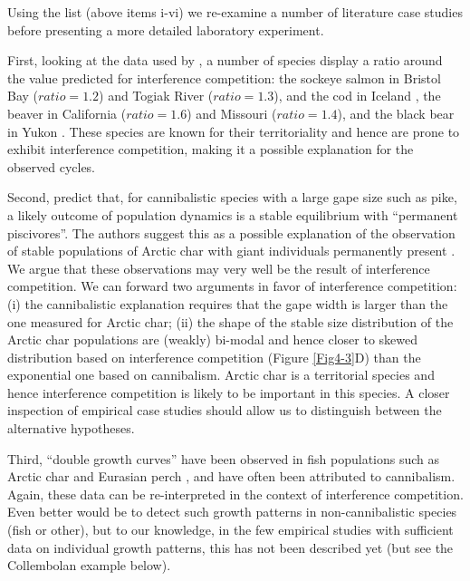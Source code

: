 Using the list (above items i-vi) we re-examine a number of literature case
studies before presenting a more detailed laboratory experiment. 

First, looking at the data used by \textcite{murdoch2002a}, a number of species
display a ratio around the value predicted for interference competition: the
sockeye salmon in Bristol Bay ($ratio=1.2$) and Togiak River ($ratio=1.3$), and
the cod in Iceland \autocite[$ratio=1.6$,]{myers1995a}, the beaver in California
($ratio=1.6$) and Missouri ($ratio=1.4$), and the black bear in Yukon
\autocite[$ratio=1.5$,]{novak1987a}.
These species are known for their territoriality
\autocite{foote1990a,nolet1994a,marshall2010a,sverdrup2011a,ping2011a} and hence
are prone to exhibit interference competition, making it a possible explanation
for the observed cycles.

Second, \textcite{claessen2002a} predict that, for cannibalistic species with a
large gape size such as pike, a likely outcome of population dynamics is a
stable equilibrium with “permanent piscivores”. The authors suggest this as a
possible explanation of the observation of stable populations of Arctic char
with giant individuals permanently present
\autocite{parker1991a,griffiths1994a,hammar2000a}. We argue that these
observations may very well be the result of interference competition. We can
forward two arguments in favor of interference competition: (i) the
cannibalistic explanation requires that the gape width is larger than the one
measured for Arctic char; (ii) the shape of the stable size distribution of the
Arctic char populations are (weakly) bi-modal and hence closer to skewed
distribution based on interference competition (Figure \ref{Fig4-3}D) than the
exponential one based on cannibalism. Arctic char is a territorial species and
hence interference competition is likely to be important in this species. A
closer inspection of empirical case studies should allow us to distinguish
between the alternative hypotheses.

Third, “double growth curves” have been observed in fish populations such as
Arctic char and Eurasian perch \autocite{cren1992a}, and have often been
attributed to cannibalism. Again, these data can be re-interpreted in the
context of interference competition. Even better would be to detect such growth
patterns in non-cannibalistic species (fish or other), but to our knowledge, in
the few empirical studies with sufficient data on individual growth patterns,
this has not been described yet (but see the Collembolan example below).


